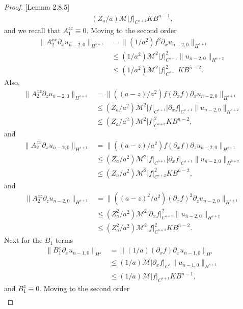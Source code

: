 \begin{proof}{[Lemma 2.8.5]}
\begin{align*}
(Z_a/a)\mathcal{M}|f|_{C^{s+2}}KB^{\overline{n}-1},
\end{align*}
and we recall that $A_1^{zz}\equiv 0$. Moving to the second order
\begin{align*}
\|A_2^{xx}\partial_x u_{\overline{n}-2,0}\|_{H^{s+1}} &= 
\|(1/a^2)f^2\partial_x u_{\overline{n}-2,0}\|_{H^{s+1}}\\&\le
(1/a^2)\mathcal{M}^2|f|_{C^{s+1}}^2\|u_{\overline{n}-2, 0}\|_{H^{s+2}} \\&\le
(1/a^2)\mathcal{M}^2|f|_{C^{s+1}}^2KB^{\overline{n}-2}.
\end{align*}
Also,
\begin{align*}
\|A_2^{xz}\partial_z u_{\overline{n}-2,0}\|_{H^{s+1}} &= 
\|((a-z)/a^2)f(\partial_x f)\partial_x u_{\overline{n}-2,0}\|_{H^{s+1}}\\&\le
(Z_a/a^2)\mathcal{M}^2|f|_{C^{s+1}}|\partial_x f|_{C^{s+1}}\|u_{\overline{n}-2, 0}\|_{H^{s+2}} \\&\le
(Z_a/a^2)\mathcal{M}^2|f|_{C^{s+2}}^2KB^{\overline{n}-2},
\end{align*}
and
\begin{align*}
\|A_2^{zx}\partial_x u_{\overline{n}-2,0}\|_{H^{s+1}} &= 
\|((a-z)/a^2)f(\partial_x f)\partial_z u_{\overline{n}-2,0}\|_{H^{s+1}}\\&\le
(Z_a/a^2)\mathcal{M}^2|f|_{C^{s+1}}|\partial_x f|_{C^{s+1}}\|u_{\overline{n}-2, 0}\|_{H^{s+2}} \\&\le
(Z_a/a^2)\mathcal{M}^2|f|_{C^{s+2}}^2KB^{\overline{n}-2},
\end{align*}
and
\begin{align*}
\|A_2^{zz}\partial_z u_{\overline{n}-2,0}\|_{H^{s+1}} &= 
\|((a-z)^2/a^2)(\partial_x f)^2\partial_z u_{\overline{n}-2,0}\|_{H^{s+1}}\\&\le
(Z_a^2/a^2)\mathcal{M}^2|\partial_x f|_{C^{s+1}}^2\|u_{\overline{n}-2, 0}\|_{H^{s+2}} \\&\le
(Z_a^2/a^2)\mathcal{M}^2|f|_{C^{s+2}}^2KB^{\overline{n}-2}.
\end{align*}
Next for the $B_1$ terms
\begin{align*}
\|B_1^{x}\partial_x u_{\overline{n}-1,0}\|_{H^{s}} &= 
\|(1/a)(\partial_x f)\partial_x u_{\overline{n}-1,0}\|_{H^{s}}\\&\le
(1/a)\mathcal{M}|\partial_x f|_{C^{s}}\|u_{\overline{n}-1, 0}\|_{H^{s+1}} \\&\le
(1/a)\mathcal{M}|f|_{C^{s+1}}KB^{\overline{n}-1},
\end{align*}
and $B_1^z\equiv 0$. Moving to the second order
\begin{align*}

\end{align*}
\end{proof}
